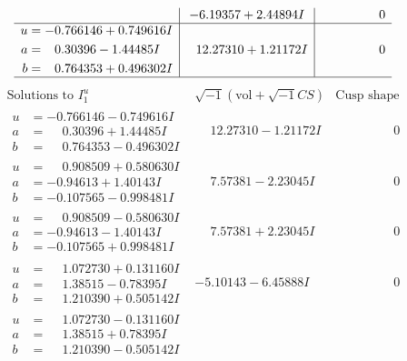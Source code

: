 \documentclass[1p]{elsarticle_modified}
\theoremstyle{definition}
\newcommand{\I}{\sqrt{-1}}
\begin{document}
$$\begin{array}{c|c|c}
 & -6.19357 + 2.44894 I & \phantom{-0.000000 } 0 \\ \hline\begin{aligned}
u &= -0.766146 + 0.749616 I \\
a &= \phantom{-}0.30396 - 1.44485 I \\
b &= \phantom{-}0.764353 + 0.496302 I\end{aligned}
 & \phantom{-}12.27310 + 1.21172 I & \phantom{-0.000000 } 0\\
 \hline 
 \end{array}$$\newpage$$\begin{array}{c|c|c}  
\text{Solutions to }I^u_{1}& \I (\text{vol} + \sqrt{-1}CS) & \text{Cusp shape}\\
 \hline 
\begin{aligned}
u &= -0.766146 - 0.749616 I \\
a &= \phantom{-}0.30396 + 1.44485 I \\
b &= \phantom{-}0.764353 - 0.496302 I\end{aligned}
 & \phantom{-}12.27310 - 1.21172 I & \phantom{-0.000000 } 0 \\ \hline\begin{aligned}
u &= \phantom{-}0.908509 + 0.580630 I \\
a &= -0.94613 + 1.40143 I \\
b &= -0.107565 - 0.998481 I\end{aligned}
 & \phantom{-}7.57381 - 2.23045 I & \phantom{-0.000000 } 0 \\ \hline\begin{aligned}
u &= \phantom{-}0.908509 - 0.580630 I \\
a &= -0.94613 - 1.40143 I \\
b &= -0.107565 + 0.998481 I\end{aligned}
 & \phantom{-}7.57381 + 2.23045 I & \phantom{-0.000000 } 0 \\ \hline\begin{aligned}
u &= \phantom{-}1.072730 + 0.131160 I \\
a &= \phantom{-}1.38515 - 0.78395 I \\
b &= \phantom{-}1.210390 + 0.505142 I\end{aligned}
 & -5.10143 - 6.45888 I & \phantom{-0.000000 } 0 \\ \hline\begin{aligned}
u &= \phantom{-}1.072730 - 0.131160 I \\
a &= \phantom{-}1.38515 + 0.78395 I \\
b &= \phantom{-}1.210390 - 0.505142 I\end{aligned}

\end{array}$$
\end{document}
